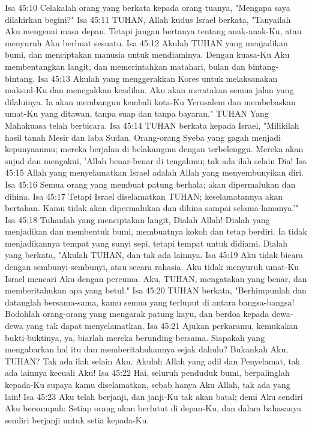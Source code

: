 Isa 45:10  Celakalah orang yang berkata kepada orang tuanya, "Mengapa saya dilahirkan begini?"
Isa 45:11  TUHAN, Allah kudus Israel berkata, "Tanyailah Aku mengenai masa depan. Tetapi jangan bertanya tentang anak-anak-Ku, atau menyuruh Aku berbuat sesuatu.
Isa 45:12  Akulah TUHAN yang menjadikan bumi, dan menciptakan manusia untuk mendiaminya. Dengan kuasa-Ku Aku membentangkan langit, dan memerintahkan matahari, bulan dan bintang-bintang.
Isa 45:13  Akulah yang menggerakkan Kores untuk melaksanakan maksud-Ku dan menegakkan keadilan. Aku akan meratakan semua jalan yang dilaluinya. Ia akan membangun kembali kota-Ku Yerusalem dan membebaskan umat-Ku yang ditawan, tanpa suap dan tanpa bayaran." TUHAN Yang Mahakuasa telah berbicara.
Isa 45:14  TUHAN berkata kepada Israel, "Milikilah hasil tanah Mesir dan laba Sudan. Orang-orang Syeba yang gagah menjadi kepunyaanmu; mereka berjalan di belakangmu dengan terbelenggu. Mereka akan sujud dan mengakui, 'Allah benar-benar di tengahmu; tak ada ilah selain Dia!
Isa 45:15  Allah yang menyelamatkan Israel adalah Allah yang menyembunyikan diri.
Isa 45:16  Semua orang yang membuat patung berhala; akan dipermalukan dan dihina.
Isa 45:17  Tetapi Israel diselamatkan TUHAN; keselamatannya akan bertahan. Kamu tidak akan dipermalukan dan dihina sampai selama-lamanya.'"
Isa 45:18  Tuhanlah yang menciptakan langit, Dialah Allah! Dialah yang menjadikan dan membentuk bumi, membuatnya kokoh dan tetap berdiri. Ia tidak menjadikannya tempat yang sunyi sepi, tetapi tempat untuk didiami. Dialah yang berkata, "Akulah TUHAN, dan tak ada lainnya.
Isa 45:19  Aku tidak bicara dengan sembunyi-sembunyi, atau secara rahasia. Aku tidak menyuruh umat-Ku Israel mencari Aku dengan percuma. Aku, TUHAN, mengatakan yang benar, dan memberitahukan apa yang betul."
Isa 45:20  TUHAN berkata, "Berhimpunlah dan datanglah bersama-sama, kamu semua yang terluput di antara bangsa-bangsa! Bodohlah orang-orang yang mengarak patung kayu, dan berdoa kepada dewa-dewa yang tak dapat menyelamatkan.
Isa 45:21  Ajukan perkaramu, kemukakan bukti-buktinya, ya, biarlah mereka berunding bersama. Siapakah yang mengabarkan hal itu dan memberitahukannya sejak dahulu? Bukankah Aku, TUHAN? Tak ada ilah selain Aku. Akulah Allah yang adil dan Penyelamat, tak ada lainnya kecuali Aku!
Isa 45:22  Hai, seluruh penduduk bumi, berpalinglah kepada-Ku supaya kamu diselamatkan, sebab hanya Aku Allah, tak ada yang lain!
Isa 45:23  Aku telah berjanji, dan janji-Ku tak akan batal; demi Aku sendiri Aku bersumpah: Setiap orang akan berlutut di depan-Ku, dan dalam bahasanya sendiri berjanji untuk setia kepada-Ku.

